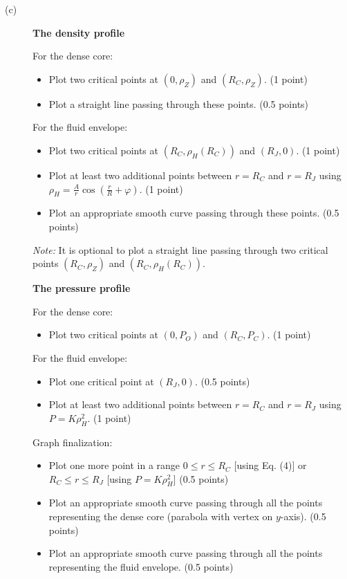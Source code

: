 \begin{description}
\item[(c)] \textbf{The density profile}

  For the dense core:
  \begin{itemize}
  \item Plot two critical points at $(0, \rho_Z)$ and $(R_C, \rho_Z)$.
    \hfill(1 point)
  \item Plot a straight line passing through these points.
    \hfill(0.5 points)
  \end{itemize}

  For the fluid envelope:
  \begin{itemize}
  \item Plot two critical points at $(R_C, \rho_H(R_C))$ and $(R_J, 0)$.
    \hfill(1 point)
  \item Plot at least two additional points between $r = R_C$ and $r = R_J$
    using $\rho_H = \frac{A}{r}\cos\left(\frac{r}{R} + \varphi\right)$.
    \hfill(1 point)
  \item Plot an appropriate smooth curve passing through these points.
    \hfill(0.5 points)
  \end{itemize}

  \textit{Note:} It is optional to plot a straight line passing through two
  critical points $(R_C, \rho_Z)$ and $(R_C, \rho_H(R_C))$.


  \textbf{The pressure profile}

  For the dense core:
  \begin{itemize}
  \item Plot two critical points at $(0, P_O)$ and $(R_C, P_C)$.
    \hfill(1 point)
  \end{itemize}

  For the fluid envelope:
  \begin{itemize}
  \item Plot one critical point at $(R_J, 0)$.
    \hfill(0.5 points)
  \item Plot at least two additional points between $r = R_C$ and $r = R_J$
    using $P = K\rho_H^2$.
    \hfill(1 point)
  \end{itemize}

  Graph finalization:
  \begin{itemize}
  \item Plot one more point in a range $0 \le r \le R_C$ [using Eq. (4)] or
    $R_C \le r \le R_J$ [using $P = K\rho_H^2$]
    \hfill(0.5 points)
  \item Plot an appropriate smooth curve passing through all the points
    representing the dense core (parabola with vertex on $y$-axis).
    \hfill(0.5 points)
  \item Plot an appropriate smooth curve passing through all the points
    representing the fluid envelope.
    \hfill(0.5 points)
  \end{itemize}


\end{description}
